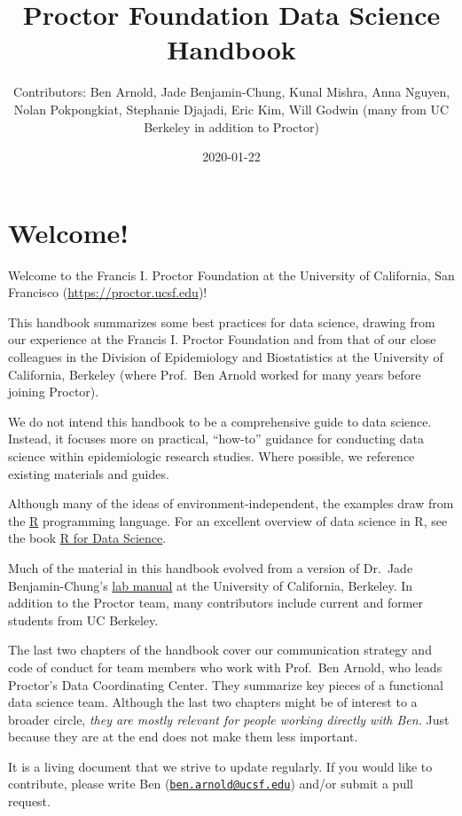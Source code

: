 \documentclass[
]{book}
\title{Proctor Foundation Data Science Handbook}
\author{Contributors: Ben Arnold, Jade Benjamin-Chung, Kunal Mishra, Anna Nguyen, Nolan Pokpongkiat, Stephanie Djajadi, Eric Kim, Will Godwin (many from UC Berkeley in addition to Proctor)}
\date{2020-01-22}
\begin{document}
\frontmatter
\maketitle

{
\setcounter{tocdepth}{1}
\tableofcontents
}
\mainmatter
\hypertarget{welcome}{%
\chapter*{Welcome!}\label{welcome}}

Welcome to the Francis I. Proctor Foundation at the University of California, San Francisco (\url{https://proctor.ucsf.edu})!

This handbook summarizes some best practices for data science, drawing from our experience at the Francis I. Proctor Foundation and from that of our close colleagues in the Division of Epidemiology and Biostatistics at the University of California, Berkeley (where Prof.~Ben Arnold worked for many years before joining Proctor).

We do not intend this handbook to be a comprehensive guide to data science. Instead, it focuses more on practical, ``how-to'' guidance for conducting data science within epidemiologic research studies. Where possible, we reference existing materials and guides.

Although many of the ideas of environment-independent, the examples draw from the \href{https://cran.r-project.org/}{R} programming language. For an excellent overview of data science in R, see the book \href{https://r4ds.had.co.nz/}{R for Data Science}.

Much of the material in this handbook evolved from a version of Dr.~Jade Benjamin-Chung's \href{https://github.com/jadebc-berkeley/lab-manual}{lab manual} at the University of California, Berkeley. In addition to the Proctor team, many contributors include current and former students from UC Berkeley.

The last two chapters of the handbook cover our communication strategy and code of conduct for team members who work with Prof.~Ben Arnold, who leads Proctor's Data Coordinating Center. They summarize key pieces of a functional data science team. Although the last two chapters might be of interest to a broader circle, \emph{they are mostly relevant for people working directly with Ben.} Just because they are at the end does not make them less important.

It is a living document that we strive to update regularly. If you would like to contribute, please write Ben (\href{mailto:ben.arnold@ucsf.edu}{\nolinkurl{ben.arnold@ucsf.edu}}) and/or submit a pull request.
\end{document}
